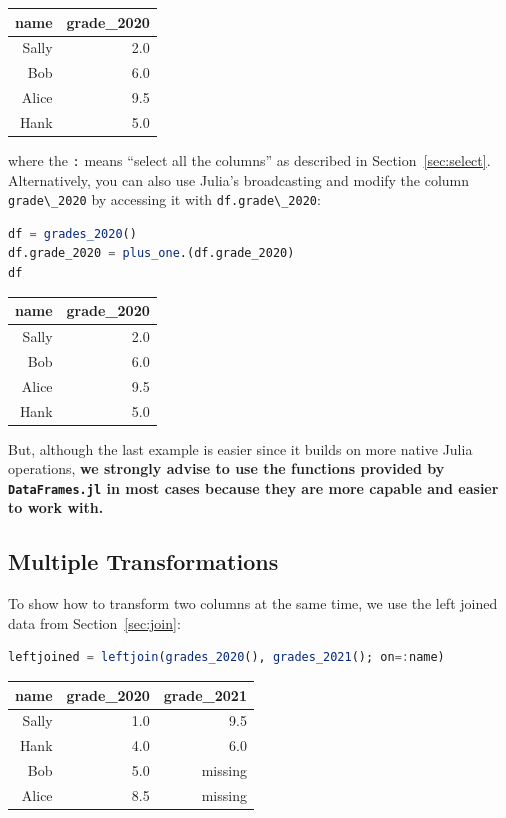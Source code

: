 \documentclass[
  notoc %
]{tufte-book}
\newcommand{\passthrough}[1]{#1}
\begin{document}
\begin{longtable}[]{@{}rr@{}}
\toprule
name & grade\_2020 \\
\midrule
\endhead
Sally & 2.0 \\
Bob & 6.0 \\
Alice & 9.5 \\
Hank & 5.0 \\
\bottomrule
\end{longtable}

where the \passthrough{\lstinline!:!} means ``select all the columns''
as described in Section~\ref{sec:select}. Alternatively, you can also
use Julia's broadcasting and modify the column
\passthrough{\lstinline!grade\_2020!} by accessing it with
\passthrough{\lstinline!df.grade\_2020!}:

\begin{lstlisting}[language=Julia]
df = grades_2020()
df.grade_2020 = plus_one.(df.grade_2020)
df
\end{lstlisting}

\begin{longtable}[]{@{}rr@{}}
\toprule
name & grade\_2020 \\
\midrule
\endhead
Sally & 2.0 \\
Bob & 6.0 \\
Alice & 9.5 \\
Hank & 5.0 \\
\bottomrule
\end{longtable}

But, although the last example is easier since it builds on more native
Julia operations, \textbf{we strongly advise to use the functions
provided by \passthrough{\lstinline!DataFrames.jl!} in most cases
because they are more capable and easier to work with.}

\hypertarget{sec:multiple_transform}{%
\subsection{Multiple Transformations}\label{sec:multiple_transform}}

To show how to transform two columns at the same time, we use the left
joined data from Section~\ref{sec:join}:

\begin{lstlisting}[language=Julia]
leftjoined = leftjoin(grades_2020(), grades_2021(); on=:name)
\end{lstlisting}

\begin{longtable}[]{@{}rrr@{}}
\toprule
name & grade\_2020 & grade\_2021 \\
\midrule
\endhead
Sally & 1.0 & 9.5 \\
Hank & 4.0 & 6.0 \\
Bob & 5.0 & missing \\
Alice & 8.5 & missing \\
\bottomrule
\end{longtable}
\end{document}
